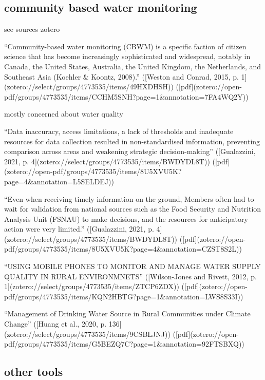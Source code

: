 {%

\subsection{community based water monitoring}
see sources zotero

“Community-based water monitoring (CBWM) is a specific faction of citizen science that has become increasingly sophisticated and widespread, notably in Canada, the United States, Australia, the United Kingdom, the Netherlands, and Southeast Asia (Koehler & Koontz, 2008).” ([Weston and Conrad, 2015, p. 1](zotero://select/groups/4773535/items/49HXDHSH)) ([pdf](zotero://open-pdf/groups/4773535/items/CCHM5SNH?page=1&annotation=7FA4WQ2Y))

mostly concerned about water quality

“Data inaccuracy, access limitations, a lack of thresholds and inadequate resources for data collection resulted in non-standardised information, preventing comparison across areas and weakening strategic decision-making” ([Gualazzini, 2021, p. 4](zotero://select/groups/4773535/items/BWDYDL8T)) ([pdf](zotero://open-pdf/groups/4773535/items/8U5XVU5K?page=4&annotation=L5SELDEJ))

“Even when receiving timely information on the ground, Members often had to wait for validation from national sources such as the Food Security and Nutrition Analysis Unit (FSNAU) to make decisions, and the resources for anticipatory action were very limited.” ([Gualazzini, 2021, p. 4](zotero://select/groups/4773535/items/BWDYDL8T)) ([pdf](zotero://open-pdf/groups/4773535/items/8U5XVU5K?page=4&annotation=CZST8S2L))

“USING MOBILE PHONES TO MONITOR AND MANAGE WATER SUPPLY QUALITY IN RURAL ENVIRONMNETS” ([Wilson-Jones and Rivett, 2012, p. 1](zotero://select/groups/4773535/items/ZTCP6ZDX)) ([pdf](zotero://open-pdf/groups/4773535/items/KQN2HBTG?page=1&annotation=LWS8S33I))

“Management of Drinking Water Source in Rural Communities under Climate Change” ([Huang et al., 2020, p. 136](zotero://select/groups/4773535/items/9CSBLJNJ)) ([pdf](zotero://open-pdf/groups/4773535/items/G5BEZQ7C?page=1&annotation=92FTSBXQ))

\subsection{other tools}

}
